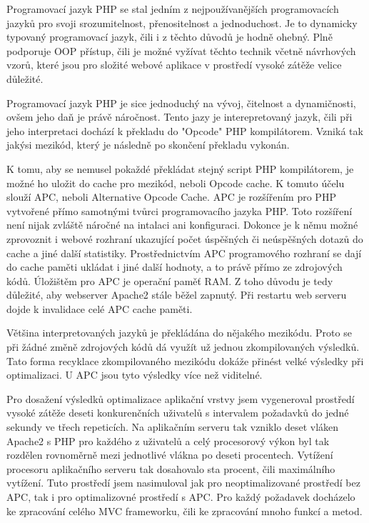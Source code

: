 \documentclass[12pt]{article}
\begin{document}
Programovací jazyk PHP se stal jedním z nejpoužívanějších programovacích jazyků pro svoji srozumitelnost, přenositelnost a jednoduchost. Je to dynamicky typovaný programovací jazyk, čili i z těchto důvodů je hodně ohebný. Plně podporuje OOP přístup, čili je možné vyžívat těchto technik včetně návrhových vzorů, které jsou pro složité webové aplikace v prostředí vysoké zátěže velice důležité.


Programovací jazyk PHP je sice jednoduchý na vývoj, čitelnost a dynamičnosti, ovšem jeho daň je právě náročnost. Tento jazy je interepretovaný jazyk, čili při jeho interpretaci dochází k překladu do "Opcode" PHP kompilátorem. Vzniká tak jakýsi mezikód, který je následně po skončení překladu vykonán.

K tomu, aby se nemusel pokaždé překládat stejný script PHP kompilátorem, je možné ho uložit do cache pro mezikód, neboli Opcode cache. K tomuto účelu slouží APC, neboli Alternative Opcode Cache. APC je rozšířením pro PHP vytvořené přímo samotnými tvůrci programovacího jazyka PHP. Toto rozšíření není nijak zvláště náročné na intalaci ani konfiguraci. Dokonce je k němu možné zprovoznit i webové rozhraní ukazující počet úspěšných či neúspěšných dotazů do cache a jiné další statistiky. Prostřednictvím APC programového rozhraní se dají do cache paměti ukládat i jiné další hodnoty, a to právě přímo ze zdrojových kódů. Úložištěm pro APC je operační paměť RAM. Z toho důvodu je tedy důležité, aby webserver Apache2 stále běžel zapnutý. Při restartu web serveru dojde k invalidace celé APC cache paměti.

Většina interpretovaných jazyků je překládána do nějakého mezikódu. Proto se při žádné změně zdrojových kódů dá využít už jednou zkompilovaných výsledků. Tato forma recyklace zkompilovaného mezikódu dokáže přinést velké výsledky při optimalizaci. U APC jsou tyto výsledky více než viditelné.

Pro dosažení výsledků optimalizace aplikační vrstvy jsem vygeneroval prostředí vysoké zátěže deseti konkurenčních uživatelů s intervalem požadavků do jedné sekundy ve třech repeticích. Na aplikačním serveru tak vzniklo deset vláken Apache2 s PHP pro každého z uživatelů a celý procesorový výkon byl tak rozdělen rovnoměrně mezi jednotlivé vlákna po deseti procentech. Vytížení procesoru aplikačního serveru tak dosahovalo sta procent, čili maximálního vytížení. Tuto prostředí jsem nasimuloval jak pro neoptimalizované prostředí bez APC, tak i pro optimalizovné prostředí s APC. Pro každý požadavek docházelo ke zpracování celého MVC frameworku, čili ke zpracování mnoho funkcí a metod.
\end{document}
